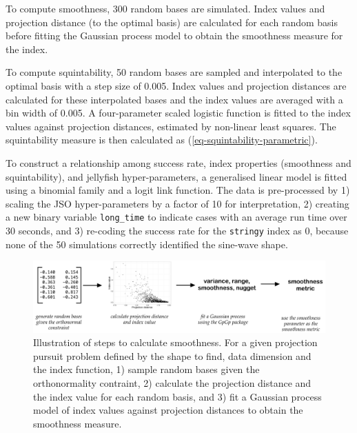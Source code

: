 \documentclass[
  12pt,
]{interact}
\theoremstyle{plain}
\begin{document}
To compute smoothness, 300 random bases are simulated. Index values and
projection distance (to the optimal basis) are calculated for each
random basis before fitting the Gaussian process model to obtain the
smoothness measure for the index.

To compute squintability, 50 random bases are sampled and interpolated
to the optimal basis with a step size of 0.005. Index values and
projection distances are calculated for these interpolated bases and the
index values are averaged with a bin width of 0.005. A four-parameter
scaled logistic function is fitted to the index values against
projection distances, estimated by non-linear least squares. The
squintability measure is then calculated as
(\ref{eq-squintability-parametric}).

To construct a relationship among success rate, index properties
(smoothness and squintability), and jellyfish hyper-parameters, a
generalised linear model is fitted using a binomial family and a logit
link function. The data is pre-processed by 1) scaling the JSO
hyper-parameters by a factor of 10 for interpretation, 2) creating a new
binary variable \texttt{long\_time} to indicate cases with an average
run time over 30 seconds, and 3) re-coding the success rate for the
\texttt{stringy} index as 0, because none of the 50 simulations
correctly identified the sine-wave shape.

\begin{figure}

{\centering \includegraphics[width=1\textwidth,height=\textheight]{figures/smoothness.png}

}

\caption{\label{fig-smoothness}Illustration of steps to calculate
smoothness. For a given projection pursuit problem defined by the shape
to find, data dimension and the index function, 1) sample random bases
given the orthonormality contraint, 2) calculate the projection distance
and the index value for each random basis, and 3) fit a Gaussian process
model of index values against projection distances to obtain the
smoothness measure.}

\end{figure}
\end{document}
